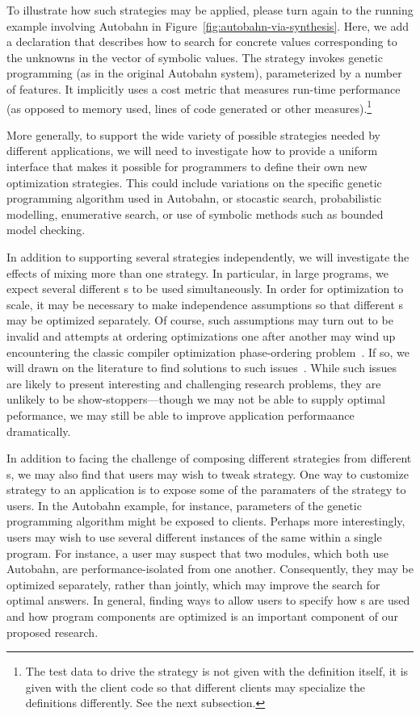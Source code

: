 To illustrate how such strategies may be applied, please turn again to
the running example \rasp involving Autobahn in
Figure~\ref{fig:autobahn-via-synthesis}.  Here, we add a declaration
that describes how to search for concrete values corresponding to the
unknowns in the  vector of symbolic values.  The strategy
invokes genetic programming (as in the original Autobahn system),
parameterized by a number of features.  It implicitly uses a
cost metric that measures run-time performance (as opposed to memory used,
lines of code generated or other measures).\footnote{The test data to drive 
the strategy is not given with the \rasp definition itself, it is given
with the client code so that different clients may specialize the \rasp
definitions differently. See the next subsection.}

More generally, to support the wide variety of possible strategies
needed by different applications, we will need to investigate how to
provide a uniform interface that makes it possible for programmers to
define their own new optimization strategies.  This could include
variations on the specific genetic programming algorithm used in
Autobahn, or stocastic search, probabilistic modelling, enumerative
search, or use of symbolic methods such as bounded model checking.

In addition to supporting several strategies independently, we will
investigate the effects of mixing more than one strategy.  In particular,
in large programs, we expect several different \rasp{}s to be used simultaneously.
In order for optimization to scale, it may be necessary to make independence assumptions
so that different \rasp{}s may be optimized separately.  Of course, such assumptions
may turn out to be invalid and attempts at ordering optimizations one after another
may wind up encountering the classic compiler optimization phase-ordering
problem~\cite{Click:combining-optimizations,Vegdahl:phase-coupling}.
 If so, we will drawn on the literature
to find solutions to such issues~\cite{Kulkarni:phase-ordering-search,Kulkarni:phase-ordering}.  While such issues are likely to present interesting
and challenging research problems, they are unlikely to be show-stoppers---though we may not
be able to supply optimal peformance, we may still be able to improve application performaance
dramatically.

In addition to facing the challenge of composing different strategies from different \rasp{}s,
we may also find that users may wish to tweak \rasp{} strategy.  One way to customize \rasp{}
strategy to an application is to expose some of the paramaters of the \rasp{} strategy to users.
In the Autobahn example, for instance, parameters of the genetic programming algorithm might
be exposed to clients.  Perhaps more interestingly, users may wish to use several different
instances of the same \rasp{} within a single program.  For instance, a user may suspect that
two modules, which both use Autobahn, are performance-isolated from one another.  Consequently,
they may be optimized separately, rather than jointly, which may improve the search for
optimal answers.  In general, finding ways to allow users to specify how \rasp{}s are used and how program
components are optimized is an important component of our proposed research.

